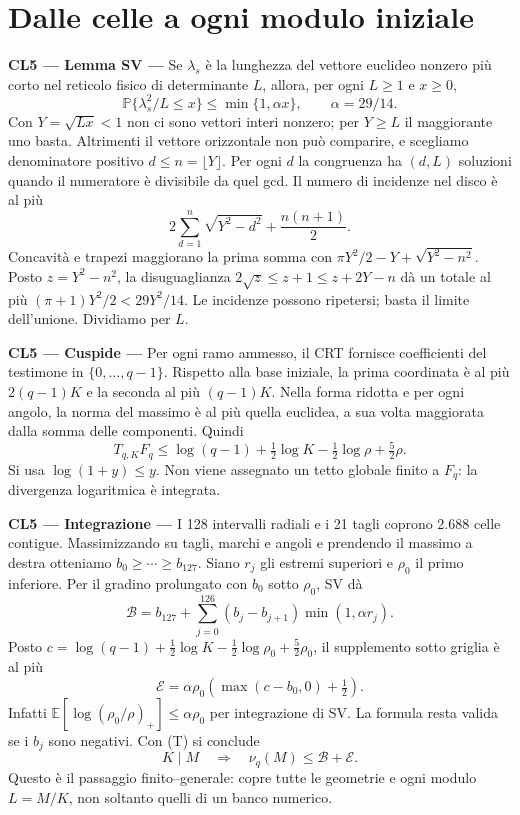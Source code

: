 \documentclass[11pt,a4paper]{article}
\newcommand{\CL}[1]{\textbf{#1 --- }}
\newcommand{\Prb}{\mathbb P}
\newcommand{\E}{\mathbb E}
\newcommand{\floor}[1]{\lfloor#1\rfloor}
\begin{document}
\section{Dalle celle a ogni modulo iniziale}
\CL{CL5 --- Lemma SV} Se $\lambda_s$ è la lunghezza del vettore euclideo nonzero più corto nel reticolo fisico di determinante $L$, allora, per ogni $L\ge1$ e $x\ge0$,
\begin{equation}
\Prb\{\lambda_s^2/L\le x\}\le\min\{1,\alpha x\},\qquad \alpha=29/14.
\tag{SV}
\end{equation}
Con $Y=\sqrt{Lx}<1$ non ci sono vettori interi nonzero; per $Y\ge L$ il maggiorante uno basta. Altrimenti il vettore orizzontale non può comparire, e scegliamo denominatore positivo $d\le n=\floor Y$. Per ogni $d$ la congruenza ha $(d,L)$ soluzioni quando il numeratore è divisibile da quel gcd. Il numero di incidenze nel disco è al più
\[
2\sum_{d=1}^n\sqrt{Y^2-d^2}+\frac{n(n+1)}2.
\]
Concavità e trapezi maggiorano la prima somma con
$\pi Y^2/2-Y+\sqrt{Y^2-n^2}$. Posto $z=Y^2-n^2$, la disuguaglianza
$2\sqrt z\le z+1\le z+2Y-n$ dà un totale al più $(\pi+1)Y^2/2<29Y^2/14$. Le incidenze possono ripetersi; basta il limite dell'unione. Dividiamo per $L$.

\CL{CL5 --- Cuspide} Per ogni ramo ammesso, il CRT fornisce coefficienti del testimone in $\{0,\ldots,q-1\}$. Rispetto alla base iniziale, la prima coordinata è al più $2(q-1)K$ e la seconda al più $(q-1)K$. Nella forma ridotta e per ogni angolo, la norma del massimo è al più quella euclidea, a sua volta maggiorata dalla somma delle componenti. Quindi
\begin{equation}
T_{q,K}F_q\le\log(q-1)+\tfrac12\log K-\tfrac12\log\rho+\tfrac52\rho.
\tag{Cusp}
\end{equation}
Si usa $\log(1+y)\le y$. Non viene assegnato un tetto globale finito a $F_q$: la divergenza logaritmica è integrata.

\CL{CL5 --- Integrazione} I 128 intervalli radiali e i 21 tagli coprono 2.688 celle contigue. Massimizzando su tagli, marchi e angoli e prendendo il massimo a destra otteniamo $b_0\ge\cdots\ge b_{127}$. Siano $r_j$ gli estremi superiori e $\rho_0$ il primo inferiore. Per il gradino prolungato con $b_0$ sotto $\rho_0$, SV dà
\[
\mathcal B=b_{127}+\sum_{j=0}^{126}(b_j-b_{j+1})\min(1,\alpha r_j).
\]
Posto $c=\log(q-1)+\frac12\log K-\frac12\log\rho_0+\frac52\rho_0$, il supplemento sotto griglia è al più
\[
\mathcal E=\alpha\rho_0\left(\max(c-b_0,0)+\tfrac12\right).
\]
Infatti $\E[\log(\rho_0/\rho)_+]\le\alpha\rho_0$ per integrazione di SV. La formula resta valida se i $b_j$ sono negativi. Con (T) si conclude
\begin{equation}
K\mid M\quad\Longrightarrow\quad\nu_q(M)\le\mathcal B+\mathcal E.
\tag{U}
\end{equation}
Questo è il passaggio finito--generale: copre tutte le geometrie e ogni modulo $L=M/K$, non soltanto quelli di un banco numerico.
\end{document}

